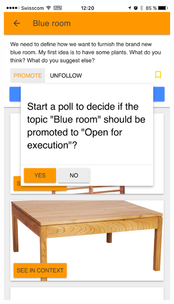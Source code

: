 \documentclass[a4paper,12pt,twoside]{article}
\begin{document}
\begin{figure}[!htb]
    \begin{subfigure}[t]{.32\textwidth}
        \includegraphics[width=\textwidth]{images/promotionPoll_dialog.png}
    \end{subfigure}
    \hfill
    \begin{subfigure}[t]{.32\textwidth}

\end{subfigure}
\end{figure}
\end{document}
